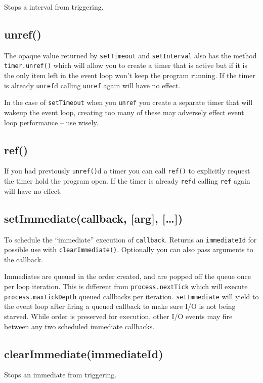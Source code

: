 Stops a interval from triggering.

\subsection{unref()}

The opaque value returned by \texttt{setTimeout} and
\texttt{setInterval} also has the method \texttt{timer.unref()} which
will allow you to create a timer that is active but if it is the only
item left in the event loop won't keep the program running. If the timer
is already \texttt{unref}d calling \texttt{unref} again will have no
effect.

In the case of \texttt{setTimeout} when you \texttt{unref} you create a
separate timer that will wakeup the event loop, creating too many of
these may adversely effect event loop performance -- use wisely.

\subsection{ref()}

If you had previously \texttt{unref()}d a timer you can call
\texttt{ref()} to explicitly request the timer hold the program open. If
the timer is already \texttt{ref}d calling \texttt{ref} again will have
no effect.

\subsection{setImmediate(callback, {[}arg{]}, {[}\ldots{}{]})}

To schedule the ``immediate'' execution of \texttt{callback}. Returns an
\texttt{immediateId} for possible use with \texttt{clearImmediate()}.
Optionally you can also pass arguments to the callback.

Immediates are queued in the order created, and are popped off the queue
once per loop iteration. This is different from
\texttt{process.nextTick} which will execute
\texttt{process.maxTickDepth} queued callbacks per iteration.
\texttt{setImmediate} will yield to the event loop after firing a queued
callback to make sure I/O is not being starved. While order is preserved
for execution, other I/O events may fire between any two scheduled
immediate callbacks.

\subsection{clearImmediate(immediateId)}

Stops an immediate from triggering.
